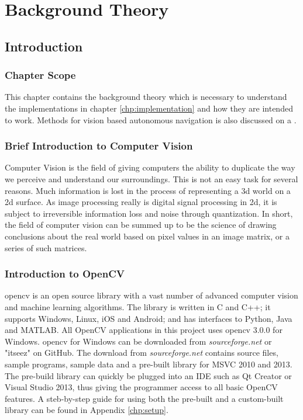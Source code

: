 \chapter{Background Theory}\label{chp:theory}

\section{Introduction}

\subsection{Chapter Scope}
This chapter contains the background theory which is necessary to understand the implementations in chapter \ref{chp:implementation} and how they are intended to work. Methods for vision based autonomous navigation is also discussed on a . 

\subsection{Brief Introduction to Computer Vision}
Computer Vision is the field of giving computers the ability to duplicate the way we perceive and understand our surroundings. This is not an easy task for several reasons. Much information is lost in the process of representing a 3d world on a 2d surface. As image processing really is digital signal processing in 2d, it is subject to irreversible information loss and noise through quantization. In short, the field of computer vision can be summed up to be the science of drawing conclusions about the real world based on pixel values in an image matrix, or a series of such matrices.

\subsection{Introduction to OpenCV}

\gls{opencv} is an  open source library with a vast number of advanced computer vision and machine learning algorithms. The library is written in C and C++; it supports Windows, Linux, iOS and Android; and has interfaces to Python, Java and MATLAB. All OpenCV applications in this project uses \gls{opencv} 3.0.0 for Windows. \gls{opencv} for Windows can be downloaded from \textit{sourceforge.net} or "itseez" on GitHub. The download from \textit{sourceforge.net} contains source files, sample programs, sample data and a pre-built library for MSVC 2010 and 2013. The pre-build library can quickly be plugged into  an IDE such as Qt Creator or Visual Studio 2013, thus giving the programmer access to all basic OpenCV features. A steb-by-step guide for using both the pre-built and a custom-built library can be found in Appendix \ref{chp:setup}.

